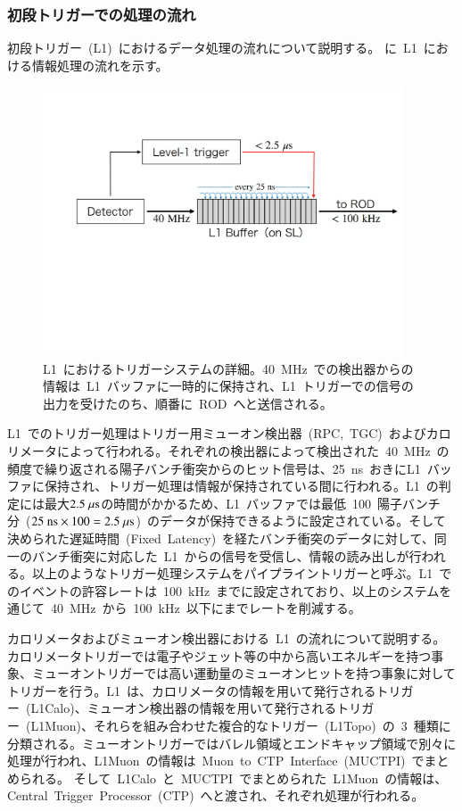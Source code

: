 \subsubsection{初段トリガーでの処理の流れ}
初段トリガー~(L1)~におけるデータ処理の流れについて説明する。
に~L1~における情報処理の流れを示す。
\begin{figure}[tbp]
        \centering   
        \includegraphics[width=0.95\textwidth,page=1]{img/pdf/pipe.pdf}
        \caption[L1~におけるトリガーシステムの詳細]{L1~におけるトリガーシステムの詳細。40~MHz~での検出器からの情報は~L1~バッファに一時的に保持され、L1~トリガーでの信号の出力を受けたのち、順番に~ROD~へと送信される。}\label{fig:pipe}
\end{figure}
L1~でのトリガー処理はトリガー用ミューオン検出器~(RPC,~TGC)~およびカロリメータによって行われる。それぞれの検出器によって検出された~40~MHz~の頻度で繰り返される陽子バンチ衝突からのヒット信号は、25~ns~おきにL1~バッファに保持され、トリガー処理は情報が保持されている間に行われる。L1~の判定には最大$2.5~\mu\rm{s}$の時間がかかるため、L1~バッファでは最低~100~陽子バンチ分~($25~\rm{ns}\times100=2.5~\mu\rm{s}$)~のデータが保持できるように設定されている。そして決められた遅延時間~(Fixed~Latency)~を経たバンチ衝突のデータに対して、同一のバンチ衝突に対応した~L1~からの信号を受信し、情報の読み出しが行われる。以上のようなトリガー処理システムをパイプライントリガーと呼ぶ。L1~でのイベントの許容レートは~100~kHz~までに設定されており、以上のシステムを通じて~40~MHz~から~100~kHz~以下にまでレートを削減する。

カロリメータおよびミューオン検出器における~L1~の流れについて説明する。カロリメータトリガーでは電子やジェット等の中から高いエネルギーを持つ事象、ミューオントリガーでは高い運動量のミューオンヒットを持つ事象に対してトリガーを行う。L1~は、カロリメータの情報を用いて発行されるトリガー~(L1Calo)、ミューオン検出器の情報を用いて発行されるトリガー~(L1Muon)、それらを組み合わせた複合的なトリガー~(L1Topo)~の~3~種類に分類される。ミューオントリガーではバレル領域とエンドキャップ領域で別々に処理が行われ、L1Muon~の情報は~Muon~to~CTP~Interface~(MUCTPI)~でまとめられる。
そして~L1Calo~と~MUCTPI~でまとめられた~L1Muon~の情報は、Central~Trigger~Processor~(CTP)~へと渡され、それぞれ処理が行われる。

